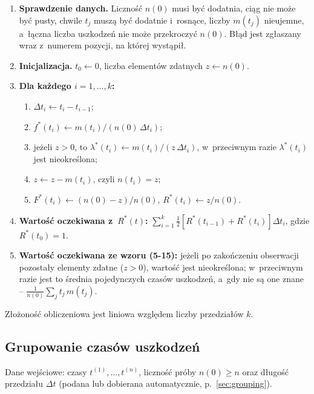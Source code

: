 \begin{enumerate}
  \item \textbf{Sprawdzenie danych.} Liczność $n(0)$ musi być dodatnia, ciąg nie może
    być pusty, chwile $t_j$ muszą być dodatnie i~rosnące, liczby $m(t_j)$ nieujemne,
    a~łączna liczba uszkodzeń nie może przekroczyć $n(0)$. Błąd jest zgłaszany wraz
    z~numerem pozycji, na której wystąpił.
  \item \textbf{Inicjalizacja.} $t_0 \leftarrow 0$, liczba elementów zdatnych
    $z \leftarrow n(0)$.
  \item \textbf{Dla każdego $i = 1, \dots, k$:}
    \begin{enumerate}
      \item $\Delta t_i \leftarrow t_i - t_{i-1}$;
      \item $f^*(t_i) \leftarrow m(t_i) / (n(0)\,\Delta t_i)$;
      \item jeżeli $z > 0$, to $\lambda^*(t_i) \leftarrow m(t_i) / (z\,\Delta t_i)$,
        w~przeciwnym razie $\lambda^*(t_i)$ jest nieokreślona;
      \item $z \leftarrow z - m(t_i)$, czyli $n(t_i) = z$;
      \item $F^*(t_i) \leftarrow (n(0) - z) / n(0)$, \quad $R^*(t_i) \leftarrow z / n(0)$.
    \end{enumerate}
  \item \textbf{Wartość oczekiwana z~$R^*(t)$:}
    $\sum_{i=1}^{k} \tfrac{1}{2}\left[R^*(t_{i-1}) + R^*(t_i)\right]\Delta t_i$, gdzie $R^*(t_0) = 1$.
  \item \textbf{Wartość oczekiwana ze wzoru (5-15):} jeżeli po zakończeniu obserwacji
    pozostały elementy zdatne ($z > 0$), wartość jest nieokreślona; w~przeciwnym razie
    jest to średnia pojedynczych czasów uszkodzeń, a~gdy nie są one znane --
    $\tfrac{1}{n(0)}\sum_{j} t_j\,m(t_j)$.
\end{enumerate}

Złożoność obliczeniowa jest liniowa względem liczby przedziałów $k$.

\subsection{Grupowanie czasów uszkodzeń}

Dane wejściowe: czasy $t^{(1)}, \dots, t^{(n)}$, liczność próby $n(0) \geq n$ oraz
długość przedziału $\Delta t$ (podana lub dobierana automatycznie, p.~\ref{sec:grouping}).

